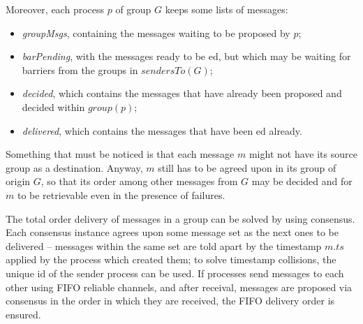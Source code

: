\documentclass[times, 10pt]{article}
\begin{document}
Moreover, each process $p$ of group $G$ keeps some lists of messages:
\begin{itemize}
  \item \textit{groupMsgs}, containing the messages waiting to be proposed by $p$;
  \item \textit{barPending}, with the messages ready to be \cons{}ed, but which may be waiting for barriers from the groups in $sendersTo(G)$;
  \item \textit{decided}, which contains the messages that have already been proposed and decided within $group(p)$;
  \item \textit{delivered}, which contains the messages that have been \cons{}ed already.
\end{itemize} 


Something that must be noticed is that each message $m$ might not have its source group as a destination. Anyway, $m$ still has to be agreed upon in its group of origin $G$, so that its order among other messages from $G$ may be decided and for %
$m$ to be retrievable even in the presence of failures.%







The total order delivery of messages in a group can be solved by using consensus. Each consensus instance agrees upon some message set as the next ones to be delivered -- messages within the same set are told apart by the timestamp $m.ts$ applied by the process which created them; to solve timestamp collisions, the unique id of the sender process can be used. If processes send messages to each other using FIFO reliable channels, and after receival, messages are proposed via consensus in the order in which they are received, the FIFO delivery order is ensured.
\end{document}
